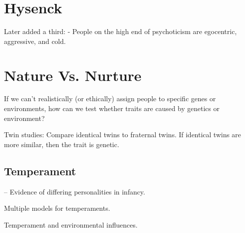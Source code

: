 \section{Hysenck}

\begin{coloredlist}
    \item {}
    \item {}
    \item Later added a third:  - People on the high end of psychoticism are egocentric, aggressive, and cold.
\end{coloredlist}

\section{Nature Vs. Nurture}

\begin{coloredlist}
    \item If we can't realistically (or ethically) assign people to specific genes or environments, how can we test whether traits are caused by genetics or environment?
    \item Twin studies: Compare identical twins to fraternal twins. If identical twins are more similar, then the trait is genetic.
\end{coloredlist}

\subsection{Temperament}

\begin{coloredlist}
    \item {} -- Evidence of differing personalities in infancy.
    \begin{coloredlist}
        \item Multiple models for temperaments.
        \item Temperament and environmental influences.
        \begin{coloredlist}
            \item 
        \end{coloredlist}
    \end{coloredlist}
\end{coloredlist}